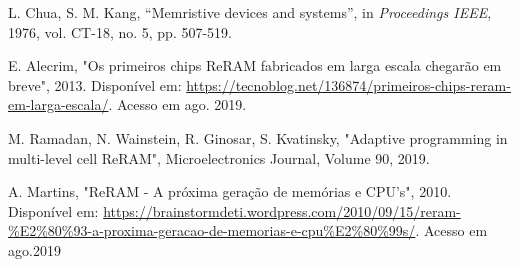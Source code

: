 \documentclass{ceel}
\begin{document}
\begin{multicols}{2}
\begin{thebibliography}{9}
    L. Chua, S. M. Kang,
    “Memristive devices and systems”, 
    in \emph{Proceedings IEEE}, 1976, vol. CT-18, no. 5, pp. 507-519.


   E. Alecrim, "Os primeiros chips ReRAM fabricados em larga escala chegarão em breve", 2013. Disponível em: \url{https://tecnoblog.net/136874/primeiros-chips-reram-em-larga-escala/}. Acesso em ago. 2019.
   
    M. Ramadan, N. Wainstein, R. Ginosar, S. Kvatinsky, "Adaptive programming in multi-level cell ReRAM", Microelectronics Journal, Volume 90, 2019. %
    
A. Martins, "ReRAM - A próxima geração de memórias e CPU’s", 2010. Disponível em: \url{https://brainstormdeti.wordpress.com/2010/09/15/reram-\%E2\%80\%93-a-proxima-geracao-de-memorias-e-cpu\%E2\%80\%99s/}. Acesso em ago.2019



\end{thebibliography}



\end{multicols}
\end{document}
